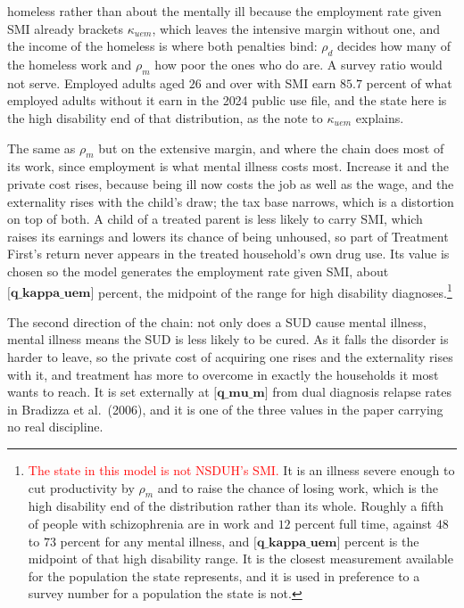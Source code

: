 \documentclass[10pt]{article}
\begin{document}
\begin{description}
{{homeless rather than about the mentally ill because the employment rate given SMI
already brackets $\kappa_{uem}$, which leaves the intensive margin without one, and the
income of the homeless is where both penalties bind: $\rho_d$ decides how many of the
homeless work and $\rho_m$ how poor the ones who do are. A survey ratio would not serve.
Employed adults aged $26$ and over with SMI earn $85.7$ percent of what employed adults
without it earn in the 2024 public use file, and the state here is the high disability
end of that distribution, as the note to $\kappa_{uem}$ explains.}}
\item[$\kappa_{uem}$, the employment multiplier for SMI.] The same as
$\rho_m$ but on the extensive margin, and where the chain does most of its work, since employment is what mental
illness costs most. Increase it and the private cost rises, because being
ill now costs the job as well as the wage, and the externality rises with the
child's draw; the tax base
narrows, which is a distortion on top of both. A child of a treated parent is less likely to carry SMI, which raises its
earnings and lowers its chance of being unhoused, so part of Treatment First's
return never appears in the treated household's own drug use. Its value is chosen
so the model generates the employment rate given SMI, about $\textbf{[q_kappa_uem]}$ percent, the
midpoint of the range for high disability diagnoses.\footnote{\textcolor{red}{The state in this model is not NSDUH's SMI.}
It is an illness severe enough to cut productivity by
$\rho_m$ and to raise the chance of losing work, which is the high disability end of
the distribution rather than its whole. Roughly a fifth of people with schizophrenia
are in work and $12$ percent full time, against $48$ to $73$ percent for any mental
illness, and $\textbf{[q_kappa_uem]}$ percent is the midpoint of that high disability range. It is the
closest measurement available for the population the state represents, and it is used
in preference to a survey number for a population the state is not.}
\item[$\mu_m$, the SUD recovery multiplier for SMI.] The second direction of the
chain: not only does a SUD cause mental illness, mental illness means the
SUD is less likely to be cured.
As it falls the disorder is harder to leave, so the private cost of
acquiring one rises and the externality rises with it, and
treatment has more to overcome in exactly the households it most wants to reach. It
is set externally at $\textbf{[q_mu_m]}$ from dual diagnosis relapse rates in Bradizza et al.\
(2006), and it is one of the three values in the paper carrying no real discipline.

\end{description}
\end{document}
